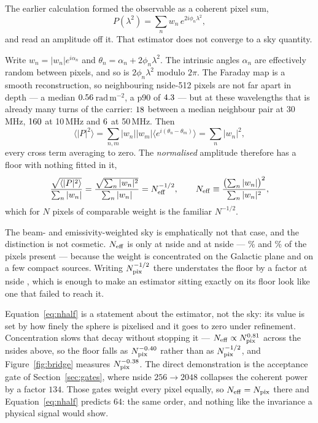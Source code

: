 \documentclass[11pt]{article}
\newcommand{\rmu}{\ensuremath{\mathrm{rad\,m^{-2}}}}
\newcommand{\lamsq}{\ensuremath{\lambda^{2}}}
\begin{document}
The earlier calculation formed the observable as a coherent pixel sum,
\begin{equation}
  P(\lamsq) = \sum_{n} w_n\, e^{2i\phi_n \lamsq},
  \label{eq:pixelsum}
\end{equation}
and read an amplitude off it. That estimator does not converge to a sky
quantity.

Write $w_n = |w_n|e^{i\alpha_n}$ and $\theta_n = \alpha_n +
2\phi_n\lamsq$. The intrinsic angles $\alpha_n$ are effectively random
between pixels, and so is $2\phi_n\lamsq$ modulo $2\pi$. The Faraday
map is a smooth reconstruction, so neighbouring nside-512 pixels are
not far apart in depth --- a median $0.56$\,\rmu, a p90 of
$4.3$ --- but at these wavelengths that is already many turns
of the carrier: $18$ between a median neighbour pair at
30\,MHz, $160$ at 10\,MHz and $6$ at 50\,MHz.
Then
\begin{equation}
  \bigl\langle |P|^2 \bigr\rangle
  = \sum_{n,m} |w_n||w_m|\bigl\langle e^{i(\theta_n-\theta_m)}\bigr\rangle
  = \sum_{n} |w_n|^2 ,
  \label{eq:walk}
\end{equation}
every cross term averaging to zero. The \emph{normalised} amplitude
therefore has a floor with nothing fitted in it,
\begin{equation}
  \frac{\sqrt{\langle |P|^2\rangle}}{\sum_n |w_n|}
  = \frac{\sqrt{\sum_n |w_n|^2}}{\sum_n |w_n|}
  = N_{\rm eff}^{-1/2},
  \qquad
  N_{\rm eff} \equiv
  \frac{\bigl(\sum_n |w_n|\bigr)^{2}}{\sum_n |w_n|^{2}} ,
  \label{eq:nhalf}
\end{equation}
which for $N$ pixels of comparable weight is the familiar $N^{-1/2}$.

The beam- and emissivity-weighted sky is emphatically not that case,
and the distinction is not cosmetic. $N_{\rm eff}$ is only
\walkNEffLo{} at nside \walkNsideLo{} and \walkNEffHi{} at nside
\walkNsideHi{} --- \walkNEffFracLo\% and \walkNEffFracHi\% of the
pixels present --- because the weight is concentrated on the Galactic
plane and on a few compact sources. Writing $N_{\rm pix}^{-1/2}$ there
understates the floor by a factor \walkFloorGap{} at nside
\walkNsideHi{}, which is enough to make an estimator sitting exactly on
its floor look like one that failed to reach it.

Equation~\eqref{eq:nhalf} is a statement about the estimator, not the
sky: its value is set by how finely the sphere is pixelised and it goes
to zero under refinement. Concentration slows that decay without
stopping it --- $N_{\rm eff} \propto N_{\rm pix}^{0.81}$
across the nsides above, so the floor falls as
$N_{\rm pix}^{-0.40}$ rather than as
$N_{\rm pix}^{-1/2}$, and Figure~\ref{fig:bridge} measures
$N_{\rm pix}^{-0.38}$. The direct demonstration is the
acceptance gate of Section~\ref{sec:gates}, where nside $256 \to 2048$
collapses the coherent power by a factor $134$. Those gates weight
every pixel equally, so $N_{\rm eff} = N_{\rm pix}$ there and
Equation~\eqref{eq:nhalf} predicts $64$: the same order, and nothing
like the invariance a physical signal would show.
\end{document}

